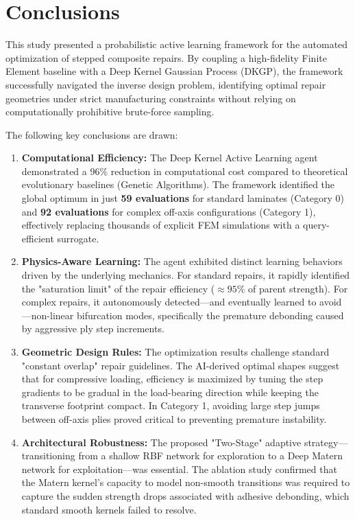 \documentclass[
  preprint,
  12pt,
  a4paper
]{elsarticle}
\begin{document}
\section{Conclusions}
\label{sec:conclusion}

This study presented a probabilistic active learning framework for the automated optimization of stepped composite repairs. By coupling a high-fidelity Finite Element baseline with a Deep Kernel Gaussian Process (DKGP), the framework successfully navigated the inverse design problem, identifying optimal repair geometries under strict manufacturing constraints without relying on computationally prohibitive brute-force sampling.

The following key conclusions are drawn:
\begin{enumerate}
    \item \textbf{Computational Efficiency:} The Deep Kernel Active Learning agent demonstrated a 96\% reduction in computational cost compared to theoretical evolutionary baselines (Genetic Algorithms). The framework identified the global optimum in just \textbf{59 evaluations} for standard laminates (Category 0) and \textbf{92 evaluations} for complex off-axis configurations (Category 1), effectively replacing thousands of explicit FEM simulations with a query-efficient surrogate.
    
    \item \textbf{Physics-Aware Learning:} The agent exhibited distinct learning behaviors driven by the underlying mechanics. For standard repairs, it rapidly identified the "saturation limit" of the repair efficiency ($\approx 95\%$ of parent strength). For complex repairs, it autonomously detected—and eventually learned to avoid—non-linear bifurcation modes, specifically the premature debonding caused by aggressive ply step increments.
    
    \item \textbf{Geometric Design Rules:} The optimization results challenge standard "constant overlap" repair guidelines. The AI-derived optimal shapes suggest that for compressive loading, efficiency is maximized by tuning the step gradients to be gradual in the load-bearing direction while keeping the transverse footprint compact. In Category 1, avoiding large step jumps between off-axis plies proved critical to preventing premature instability.
    
    \item \textbf{Architectural Robustness:} The proposed "Two-Stage" adaptive strategy—transitioning from a shallow RBF network for exploration to a Deep Matern network for exploitation—was essential. The ablation study confirmed that the Matern kernel's capacity to model non-smooth transitions was required to capture the sudden strength drops associated with adhesive debonding, which standard smooth kernels failed to resolve.
\end{enumerate}
\end{document}
